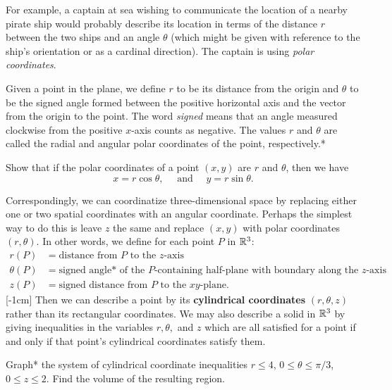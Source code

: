 \documentclass{watsonbook}
\begin{document}
For example, a captain at sea wishing to communicate the location of a
nearby pirate ship would probably describe its location in terms of
the distance $r$ between the two ships and an angle $\theta$ (which
might be given with reference to the ship's orientation or as a
cardinal direction). The captain is using \textit{polar coordinates}. 

Given a point in the plane, we define $r$ to be its distance from the
origin and $\theta$ to be the signed angle formed between the positive
horizontal axis and the vector from the origin to the point. The word
\textit{signed} means that an angle measured clockwise from the
positive $x$-axis counts as negative. The values $r$ and $\theta$ are
called the radial and angular polar coordinates of the point,
respectively.* 

\begin{exercise}{}{}
  Show that if the polar coordinates of a point $(x,y)$ are $r$ and
  $\theta$, then we have
  \[
    x = r\cos \theta, \quad \text { and } \quad y  = r\sin \theta. 
  \]
\end{exercise}

Correspondingly, we can coordinatize three-dimensional space by
replacing either one or two spatial coordinates with an angular
coordinate. Perhaps the simplest way to do this is leave $z$ the same
and replace $(x,y)$ with polar coordinates $(r,\theta)$. In other
words, we define for each point $P$ in $\mathbb{R}^3$:  
\begin{align*}
  r(P) &= \text{distance from $P$ to the }z\text{-axis} \\
  \theta(P) &= \text{signed angle* of the $P$-containing half-plane
              with boundary along the $z$-axis} \\ 
  z(P) &= \text{signed distance from $P$ to the }xy\text{-plane}. 
\end{align*} [-1cm]
Then we can describe a point by its \textbf{cylindrical coordinates}
$(r,\theta, z)$ rather than its rectangular coordinates. We may also
describe a solid in $\mathbb{R}^3$ by giving inequalities in the variables
$r, \theta,$ and $z$ which are all satisfied for a point if and only
if that point's cylindrical coordinates satisfy them.

\begin{example}{}{}
  Graph* the system of cylindrical coordinate inequalities $r \leq 4$,
  $0 \leq \theta \leq \pi/3$, $0 \leq z \leq 2$. Find the volume of
  the resulting region. 
\end{example}
\end{document}
